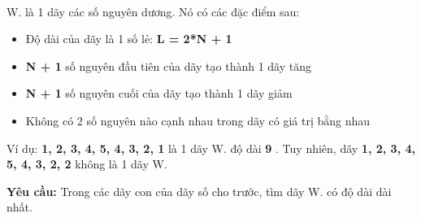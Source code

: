  

W. là 1 dãy các số nguyên dương. Nó có các đặc điểm sau:
\begin{itemize}
	\item Độ dài của dãy là 1 số lẻ: \textbf{ L = 2*N + 1 }
	\item \textbf{N + 1 } số nguyên đầu tiên của dãy tạo thành 1 dãy tăng
	\item \textbf{N + 1 } số nguyên cuối của dãy tạo thành 1 dãy giảm
	\item Không có 2 số nguyên nào cạnh nhau trong dãy có giá trị bằng nhau
\end{itemize}

Ví dụ: \textbf{ 1, 2, 3, 4, 5, 4, 3, 2, 1 } là 1 dãy W. độ dài \textbf{ 9 } . Tuy nhiên, dãy \textbf{ 1, 2, 3, 4, 5, 4, 3, 2, 2 } không là 1 dãy W.

\textbf{Yêu cầu: } Trong các dãy con của dãy số cho trước, tìm dãy W. có độ dài dài nhất.